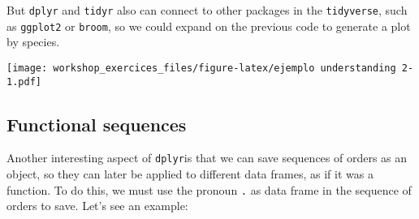 \documentclass[]{article}
\newenvironment{Shaded}{\begin{snugshade}}{\end{snugshade}}
\newcommand{\KeywordTok}[1]{\textcolor[rgb]{0.13,0.29,0.53}{\textbf{#1}}}
\newcommand{\DataTypeTok}[1]{\textcolor[rgb]{0.13,0.29,0.53}{#1}}
\newcommand{\DecValTok}[1]{\textcolor[rgb]{0.00,0.00,0.81}{#1}}
\newcommand{\StringTok}[1]{\textcolor[rgb]{0.31,0.60,0.02}{#1}}
\newcommand{\OperatorTok}[1]{\textcolor[rgb]{0.81,0.36,0.00}{\textbf{#1}}}
\newcommand{\NormalTok}[1]{#1}
\begin{document}
But \texttt{dplyr} and \texttt{tidyr} also can connect to other packages
in the \texttt{tidyverse}, such as \texttt{ggplot2} or \texttt{broom},
so we could expand on the previous code to generate a plot by species.

\begin{Shaded}
\end{Shaded}

\texttt{[image: workshop\_exercices\_files/figure-latex/ejemplo understanding 2-1.pdf]}

\subsection{Functional sequences}\label{functional-sequences}

Another interesting aspect of \texttt{dplyr}is that we can save
sequences of orders as an object, so they can later be applied to
different data frames, as if it was a function. To do this, we must use
the pronoun \texttt{.} as data frame in the sequence of orders to save.
Let's see an example:

\begin{Shaded}
\end{Shaded}
\end{document}

